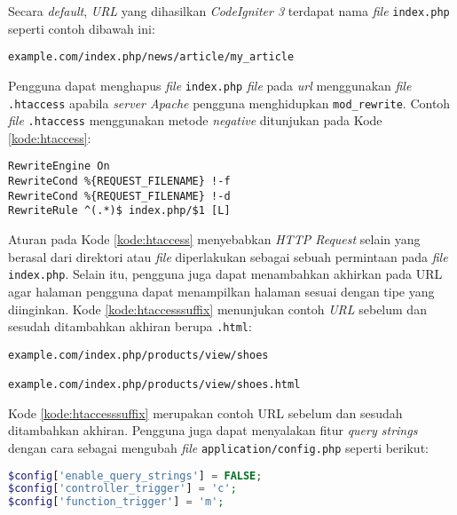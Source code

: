 Secara \textit{default}, \textit{URL} yang dihasilkan \textit{CodeIgniter 3} terdapat nama \textit{file} \verb|index.php| seperti contoh dibawah ini:

\begin{center}
\verb|example.com/index.php/news/article/my_article|
\end{center}

Pengguna dapat menghapus \textit{file} \verb|index.php| \textit{file} pada \textit{url} menggunakan \textit{file} \verb|.htaccess| apabila \textit{server Apache} pengguna menghidupkan \verb|mod_rewrite|. Contoh \textit{file} \verb|.htaccess| menggunakan metode \textit{negative} ditunjukan pada Kode \ref{kode:htaccess}:

\begin{lstlisting}[caption=Contoh \textit{file} \texttt{.htaccess} pada halaman index.php, label=kode:htaccess]
RewriteEngine On
RewriteCond %{REQUEST_FILENAME} !-f
RewriteCond %{REQUEST_FILENAME} !-d
RewriteRule ^(.*)$ index.php/$1 [L]
\end{lstlisting}

Aturan pada Kode \ref{kode:htaccess} menyebabkan \textit{HTTP Request} selain yang berasal dari direktori atau \textit{file} diperlakukan sebagai sebuah permintaan pada \textit{file} \verb|index.php|. Selain itu, pengguna juga dapat menambahkan akhirkan pada URL agar halaman pengguna dapat menampilkan halaman sesuai dengan tipe yang diinginkan. Kode \ref{kode:htaccesssuffix} menunjukan contoh \textit{URL} sebelum dan sesudah ditambahkan akhiran berupa \texttt{.html}: 

\begin{lstlisting}[caption=Contoh URL sebelum dan sesudah ditambahkan akhiran, label=kode:htaccesssuffix]
example.com/index.php/products/view/shoes

example.com/index.php/products/view/shoes.html
\end{lstlisting}

Kode \ref{kode:htaccesssuffix} merupakan contoh URL sebelum dan sesudah ditambahkan akhiran. Pengguna juga dapat menyalakan fitur \textit{query strings} dengan cara sebagai mengubah \textit{file} \texttt{application/config.php} seperti berikut:

\begin{lstlisting}[language=PHP, caption=\textit{File application/config.php}, label=kode:querystring]
$config['enable_query_strings'] = FALSE;
$config['controller_trigger'] = 'c';
$config['function_trigger'] = 'm';
\end{lstlisting}


